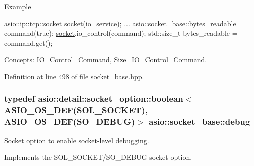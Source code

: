 \begin{DoxyParagraph}{Example}

\begin{DoxyCode}
\hyperlink{classasio_1_1basic__stream__socket}{asio::ip::tcp::socket} \hyperlink{namespacewebsocketpp_1_1transport_1_1asio_1_1socket_1_1error_a828ddaa5ed63a761e1b557465a35f05aa0c31b356014843e1d09514e794a539a7}{socket}(io\_service); 
...
asio::socket\_base::bytes\_readable command(\textcolor{keyword}{true});
\hyperlink{namespacewebsocketpp_1_1transport_1_1asio_1_1socket_1_1error_a828ddaa5ed63a761e1b557465a35f05aa0c31b356014843e1d09514e794a539a7}{socket}.io\_control(command);
std::size\_t bytes\_readable = command.get();
\end{DoxyCode}

\end{DoxyParagraph}
\begin{DoxyParagraph}{Concepts\+:}
I\+O\+\_\+\+Control\+\_\+\+Command, Size\+\_\+\+I\+O\+\_\+\+Control\+\_\+\+Command. 
\end{DoxyParagraph}


Definition at line 498 of file socket\+\_\+base.\+hpp.

\hypertarget{classasio_1_1socket__base_a90b6054fb9139cda8b29a79d67ebe313}{}
\subsubsection[{debug}]{\setlength{\rightskip}{0pt plus 5cm}typedef {\bf asio\+::detail\+::socket\+\_\+option\+::boolean}$<$ {\bf A\+S\+I\+O\+\_\+\+O\+S\+\_\+\+D\+E\+F}(S\+O\+L\+\_\+\+S\+O\+C\+K\+E\+T), {\bf A\+S\+I\+O\+\_\+\+O\+S\+\_\+\+D\+E\+F}(S\+O\+\_\+\+D\+E\+B\+U\+G)$>$ {\bf asio\+::socket\+\_\+base\+::debug}}\label{classasio_1_1socket__base_a90b6054fb9139cda8b29a79d67ebe313}


Socket option to enable socket-\/level debugging. 

Implements the S\+O\+L\+\_\+\+S\+O\+C\+K\+E\+T/\+S\+O\+\_\+\+D\+E\+B\+U\+G socket option.

